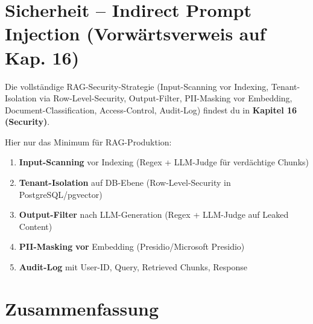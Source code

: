 \section{Sicherheit -- Indirect Prompt Injection (Vorwärtsverweis auf Kap. 16)}


Die vollständige RAG-Security-Strategie (Input-Scanning vor Indexing, Tenant-Isolation via Row-Level-Security, Output-Filter, PII-Masking vor Embedding, Document-Classification, Access-Control, Audit-Log) findest du in \textbf{Kapitel 16 (Security)}.

Hier nur das Minimum für RAG-Produktion:
\begin{enumerate}
    \item \textbf{Input-Scanning} vor Indexing (Regex + LLM-Judge für verdächtige Chunks)
    \item \textbf{Tenant-Isolation} auf DB-Ebene (Row-Level-Security in PostgreSQL/pgvector)
    \item \textbf{Output-Filter} nach LLM-Generation (Regex + LLM-Judge auf Leaked Content)
    \item \textbf{PII-Masking} \textbf{vor} Embedding (Presidio/Microsoft Presidio)
    \item \textbf{Audit-Log} mit User-ID, Query, Retrieved Chunks, Response
\end{enumerate}

\section{Zusammenfassung}


